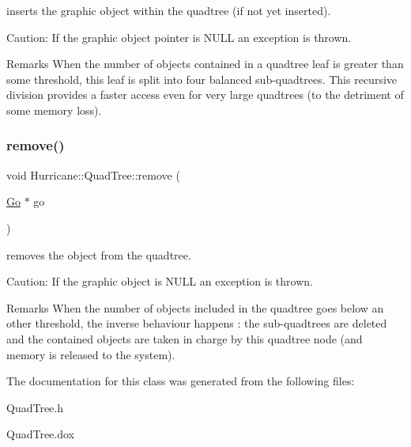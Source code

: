 inserts the graphic object within the quadtree (if not yet inserted).

\begin{DoxyParagraph}{Caution\+: If the graphic object pointer is N\+U\+LL an exception is thrown. }

\end{DoxyParagraph}
\begin{DoxyRemark}{Remarks}
When the number of objects contained in a quadtree leaf is greater than some threshold, this leaf is split into four balanced sub-\/quadtrees. This recursive division provides a faster access even for very large quadtrees (to the detriment of some memory loss). 
\end{DoxyRemark}
\mbox{\label{classHurricane_1_1QuadTree_af646d2864c70f6456d845c2d6a8d1785}} 
\subsubsection{\texorpdfstring{remove()}{remove()}}
{\footnotesize\ttfamily void Hurricane\+::\+Quad\+Tree\+::remove (\begin{DoxyParamCaption}\item[{\mbox{\hyperlink{classHurricane_1_1Go}{Go}} $\ast$}]{go }\end{DoxyParamCaption})}

removes the object from the quadtree.

\begin{DoxyParagraph}{Caution\+: If the graphic object is N\+U\+LL an exception is thrown. }

\end{DoxyParagraph}
\begin{DoxyRemark}{Remarks}
When the number of objects included in the quadtree goes below an other threshold, the inverse behaviour happens \+: the sub-\/quadtrees are deleted and the contained objects are taken in charge by this quadtree node (and memory is released to the system). 
\end{DoxyRemark}


The documentation for this class was generated from the following files\+:\begin{DoxyCompactItemize}
\item 
Quad\+Tree.\+h\item 
Quad\+Tree.\+dox\end{DoxyCompactItemize}
